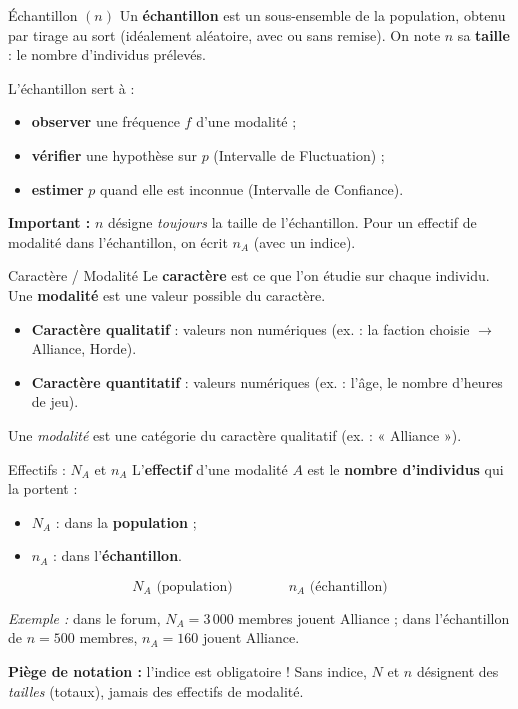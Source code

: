 \documentclass[11pt,a4paper]{article}
\begin{document}
	\begin{fiche}{Échantillon $\left(n\right)$}
		Un \textbf{échantillon} est un sous-ensemble de la population, obtenu par tirage
		au sort (idéalement aléatoire, avec ou sans remise). On note $n$ sa
		\textbf{taille} : le nombre d'individus prélevés.
		
		L'échantillon sert à :
		\begin{itemize}
			\item \textbf{observer} une fréquence $f$ d'une modalité ;
			\item \textbf{vérifier} une hypothèse sur $p$ (Intervalle de Fluctuation) ;
			\item \textbf{estimer} $p$ quand elle est inconnue (Intervalle de Confiance).
		\end{itemize}
		\begin{notebox}
			\textbf{Important :} $n$ désigne \emph{toujours} la taille de l'échantillon.
			Pour un effectif de modalité dans l'échantillon, on écrit $n_A$ (avec un indice).
		\end{notebox}
	\end{fiche}
	
	\begin{fiche}{Caractère / Modalité}
		Le \textbf{caractère} est ce que l'on étudie sur chaque individu. Une
		\textbf{modalité} est une valeur possible du caractère.
		\begin{itemize}
			\item \textbf{Caractère qualitatif} : valeurs non numériques
			(ex. : la faction choisie $\rightarrow$ Alliance, Horde).
			\item \textbf{Caractère quantitatif} : valeurs numériques
			(ex. : l'âge, le nombre d'heures de jeu).
		\end{itemize}
		Une \emph{modalité} est une catégorie du caractère qualitatif (ex. : « Alliance »).
	\end{fiche}
	
	\begin{fiche}{Effectifs : $N_A$ et $n_A$}
		L'\textbf{effectif} d'une modalité $A$ est le \textbf{nombre d'individus} qui la
		portent :
		\begin{itemize}
			\item $N_A$ : dans la \textbf{population} ;
			\item $n_A$ : dans l'\textbf{échantillon}.
		\end{itemize}
		\begin{formule}
			\[ N_A \text{ (population)} \qquad\qquad n_A \text{ (échantillon)} \]
		\end{formule}
		\emph{Exemple :} dans le forum, $N_A = 3\,000$ membres jouent Alliance ; dans
		l'échantillon de $n = 500$ membres, $n_A = 160$ jouent Alliance.
		\begin{notebox}
			\textbf{Piège de notation :} l'indice est obligatoire ! Sans indice, $N$ et $n$
			désignent des \emph{tailles} (totaux), jamais des effectifs de modalité.
		\end{notebox}
	\end{fiche}
	
\end{document}

